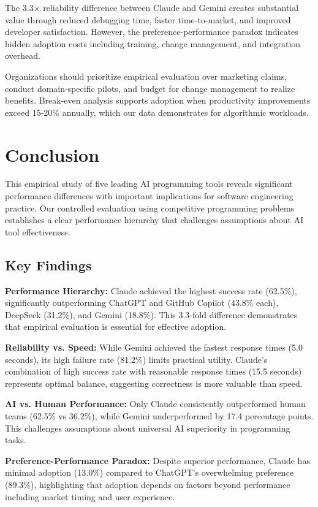 \documentclass[conference]{IEEEtran}
\begin{document}
The 3.3× reliability difference between Claude and Gemini creates substantial value through reduced debugging time, faster time-to-market, and improved developer satisfaction. However, the preference-performance paradox indicates hidden adoption costs including training, change management, and integration overhead.

Organizations should prioritize empirical evaluation over marketing claims, conduct domain-specific pilots, and budget for change management to realize benefits. Break-even analysis supports adoption when productivity improvements exceed 15-20\% annually, which our data demonstrates for algorithmic workloads.

\section{Conclusion}

This empirical study of five leading AI programming tools reveals significant performance differences with important implications for software engineering practice. Our controlled evaluation using competitive programming problems establishes a clear performance hierarchy that challenges assumptions about AI tool effectiveness.

\subsection{Key Findings}

\textbf{Performance Hierarchy:} Claude achieved the highest success rate (62.5\%), significantly outperforming ChatGPT and GitHub Copilot (43.8\% each), DeepSeek (31.2\%), and Gemini (18.8\%). This 3.3-fold difference demonstrates that empirical evaluation is essential for effective adoption.

\textbf{Reliability vs. Speed:} While Gemini achieved the fastest response times (5.0 seconds), its high failure rate (81.2\%) limits practical utility. Claude's combination of high success rate with reasonable response times (15.5 seconds) represents optimal balance, suggesting correctness is more valuable than speed.

\textbf{AI vs. Human Performance:} Only Claude consistently outperformed human teams (62.5\% vs 36.2\%), while Gemini underperformed by 17.4 percentage points. This challenges assumptions about universal AI superiority in programming tasks.

\textbf{Preference-Performance Paradox:} Despite superior performance, Claude has minimal adoption (13.0\%) compared to ChatGPT's overwhelming preference (89.3\%), highlighting that adoption depends on factors beyond performance including market timing and user experience.
\end{document}
